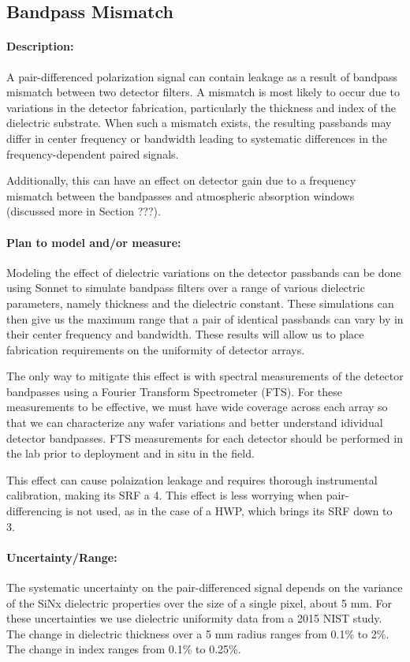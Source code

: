 \subsection{Bandpass Mismatch}
\paragraph{Description:}
A pair-differenced polarization signal can contain leakage as a result of bandpass mismatch between two detector filters. A mismatch is most likely to occur due to variations in the detector fabrication, particularly the thickness and index of the dielectric substrate. When such a mismatch exists, the resulting passbands may differ in center frequency or bandwidth leading to systematic differences in the frequency-dependent paired signals.

Additionally, this can have an effect on detector gain due to a frequency mismatch between the bandpasses and atmospheric absorption windows (discussed more in Section ???).

\paragraph{Plan to model and/or measure:}
Modeling the effect of dielectric variations on the detector passbands can be done using Sonnet to simulate bandpass filters over a range of various dielectric parameters, namely thickness and the dielectric constant. These simulations can then give us the maximum range that a pair of identical passbands can vary by in their center frequency and bandwidth. These results will allow us to place fabrication requirements on the uniformity of detector arrays.

The only way to mitigate this effect is with spectral measurements of the detector bandpasses using a Fourier Transform Spectrometer (FTS). For these measurements to be effective, we must have wide coverage across each array so that we can characterize any wafer variations and better understand idividual detector bandpasses. FTS measurements for each detector should be performed in the lab prior to deployment and in situ in the field.

This effect can cause polaization leakage and requires thorough instrumental calibration, making its SRF a 4. This effect is less worrying when pair-differencing is not used, as in the case of a HWP, which brings its SRF down to 3.

\paragraph{Uncertainty/Range:}
The systematic uncertainty on the pair-differenced signal depends on the variance of the SiNx dielectric properties over the size of a single pixel, about 5 mm. For these uncertainties we use dielectric uniformity data from a 2015 NIST study. The change in dielectric thickness over a 5 mm radius ranges from 0.1\% to 2\%. The change in index ranges from 0.1\% to 0.25\%.

